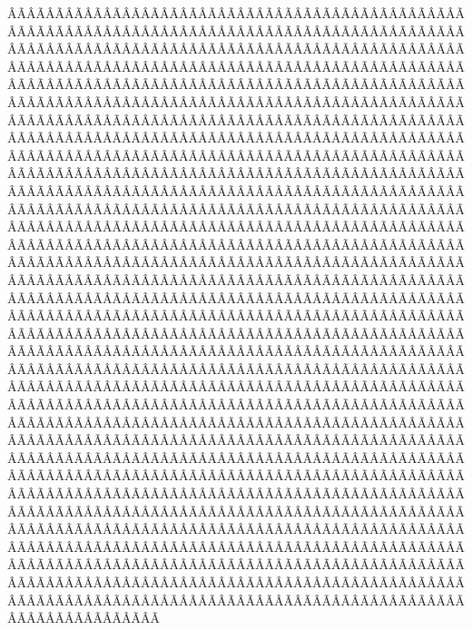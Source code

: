 \begin{sumilla}
\begin{fundamentacion}
ÂÃÂÃÂÃÂÃÂÃÂÃÂÃÂÃÂÃÂÃÂÃÂÃÂÃÂÃÂÃÂÃÂÃÂÃÂÃÂÃÂÃÂÃÂÃÂÃÂÃÂÃÂÃÂÃÂÃÂÃÂÃÂÃÂÃÂÃÂÃÂÃÂÃÂÃÂÃÂÃÂÃÂÃÂÃÂÃÂÃÂÃÂÃÂÃÂÃÂÃÂÃÂÃÂÃÂÃÂÃÂÃÂÃÂÃÂÃÂÃÂÃÂÃÂÃÂÃÂÃÂÃÂÃÂÃÂÃÂÃÂÃÂÃÂÃÂÃÂÃÂÃÂÃÂÃÂÃÂÃÂÃÂÃÂÃÂÃÂÃÂÃÂÃÂÃÂÃÂÃÂÃÂÃÂÃÂÃÂÃÂÃÂÃÂÃÂÃÂÃÂÃÂÃÂÃÂÃÂÃÂÃÂÃÂÃÂÃÂÃÂÃÂÃÂÃÂÃÂÃÂÃÂÃÂÃÂÃÂÃÂÃÂÃÂÃÂÃÂÃÂÃÂÃÂÃÂÃÂÃÂÃÂÃÂÃÂÃÂÃÂÃÂÃÂÃÂÃÂÃÂÃÂÃÂÃÂÃÂÃÂÃÂÃÂÃÂÃÂÃÂÃÂÃÂÃÂÃÂÃÂÃÂÃÂÃÂÃÂÃÂÃÂÃÂÃÂÃÂÃÂÃÂÃÂÃÂÃÂÃÂÃÂÃÂÃÂÃÂÃÂÃÂÃÂÃÂÃÂÃÂÃÂÃÂÃÂÃÂÃÂÃÂÃÂÃÂÃÂÃÂÃÂÃÂÃÂÃÂÃÂÃÂÃÂÃÂÃÂÃÂÃÂÃÂÃÂÃÂÃÂÃÂÃÂÃÂÃÂÃÂÃÂÃÂÃÂÃÂÃÂÃÂÃÂÃÂÃÂÃÂÃÂÃÂÃÂÃÂÃÂÃÂÃÂÃÂÃÂÃÂÃÂÃÂÃÂÃÂÃÂÃÂÃÂÃÂÃÂÃÂÃÂÃÂÃÂÃÂÃÂÃÂÃÂÃÂÃÂÃÂÃÂÃÂÃÂÃÂÃÂÃÂÃÂÃÂÃÂÃÂÃÂÃÂÃÂÃÂÃÂÃÂÃÂÃÂÃÂÃÂÃÂÃÂÃÂÃÂÃÂÃÂÃÂÃÂÃÂÃÂÃÂÃÂÃÂÃÂÃÂÃÂÃÂÃÂÃÂÃÂÃÂÃÂÃÂÃÂÃÂÃÂÃÂÃÂÃÂÃÂÃÂÃÂÃÂÃÂÃÂÃÂÃÂÃÂÃÂÃÂÃÂÃÂÃÂÃÂÃÂÃÂÃÂÃÂÃÂÃÂÃÂÃÂÃÂÃÂÃÂÃÂÃÂÃÂÃÂÃÂÃÂÃÂÃÂÃÂÃÂÃÂÃÂÃÂÃÂÃÂÃÂÃÂÃÂÃÂÃÂÃÂÃÂÃÂÃÂÃÂÃÂÃÂÃÂÃÂÃÂÃÂÃÂÃÂÃÂÃÂÃÂÃÂÃÂÃÂÃÂÃÂÃÂÃÂÃÂÃÂÃÂÃÂÃÂÃÂÃÂÃÂÃÂÃÂÃÂÃÂÃÂÃÂÃÂÃÂÃÂÃÂÃÂÃÂÃÂÃÂÃÂÃÂÃÂÃÂÃÂÃÂÃÂÃÂÃÂÃÂÃÂÃÂÃÂÃÂÃÂÃÂÃÂÃÂÃÂÃÂÃÂÃÂÃÂÃÂÃÂÃÂÃÂÃÂÃÂÃÂÃÂÃÂÃÂÃÂÃÂÃÂÃÂÃÂÃÂÃÂÃÂÃÂÃÂÃÂÃÂÃÂÃÂÃÂÃÂÃÂÃÂÃÂÃÂÃÂÃÂÃÂÃÂÃÂÃÂÃÂÃÂÃÂÃÂÃÂÃÂÃÂÃÂÃÂÃÂÃÂÃÂÃÂÃÂÃÂÃÂÃÂÃÂÃÂÃÂÃÂÃÂÃÂÃÂÃÂÃÂÃÂÃÂÃÂÃÂÃÂÃÂÃÂÃÂÃÂÃÂÃÂÃÂÃÂÃÂÃÂÃÂÃÂÃÂÃÂÃÂÃÂÃÂÃÂÃÂÃÂÃÂÃÂÃÂÃÂÃÂÃÂÃÂÃÂÃÂÃÂÃÂÃÂÃÂÃÂÃÂÃÂÃÂÃÂÃÂÃÂÃÂÃÂÃÂÃÂÃÂÃÂÃÂÃÂÃÂÃÂÃÂÃÂÃÂÃÂÃÂÃÂÃÂÃÂÃÂÃÂÃÂÃÂÃÂÃÂÃÂÃÂÃÂÃÂÃÂÃÂÃÂÃÂÃÂÃÂÃÂÃÂÃÂÃÂÃÂÃÂÃÂÃÂÃÂÃÂÃÂÃÂÃÂÃÂÃÂÃÂÃÂÃÂÃÂÃÂÃÂÃÂÃÂÃÂÃÂÃÂÃÂÃÂÃÂÃÂÃÂÃÂÃÂÃÂÃÂÃÂÃÂÃÂÃÂÃÂÃÂÃÂÃÂÃÂÃÂÃÂÃÂÃÂÃÂÃÂÃÂÃÂÃÂÃÂÃÂÃÂÃÂÃÂÃÂÃÂÃÂÃÂÃÂÃÂÃÂÃÂÃÂÃÂÃÂÃÂÃÂÃÂÃÂÃÂÃÂÃÂÃÂÃÂÃÂÃÂÃÂÃÂÃÂÃÂÃÂÃÂÃÂÃÂÃÂÃÂÃÂÃÂÃÂÃÂÃÂÃÂÃÂÃÂÃÂÃÂÃÂÃÂÃÂÃÂÃÂÃÂÃÂÃÂÃÂÃÂÃÂÃÂÃÂÃÂÃÂÃÂÃÂÃÂÃÂÃÂÃÂÃÂÃÂÃÂÃÂÃÂÃÂÃÂÃÂÃÂÃÂÃÂÃÂÃÂÃÂÃÂÃÂÃÂÃÂÃÂÃÂÃÂÃÂÃÂÃÂÃÂÃÂÃÂÃÂÃÂÃÂÃÂÃÂÃÂÃÂÃÂÃÂÃÂÃÂÃÂÃÂÃÂÃÂÃÂÃÂÃÂÃÂÃÂÃÂÃÂÃÂÃÂÃÂÃÂÃÂÃÂÃÂÃÂÃÂÃÂÃÂÃÂÃÂÃÂÃÂÃÂÃÂÃÂÃÂÃÂÃÂÃÂÃÂÃÂÃÂÃÂÃÂÃÂÃÂÃÂÃÂÃÂÃÂÃÂÃÂÃÂÃÂÃÂÃÂÃÂÃÂÃÂÃÂÃÂÃÂÃÂÃÂÃÂÃÂÃÂÃÂÃÂÃÂÃÂÃÂÃÂÃÂÃÂÃÂÃÂÃÂÃÂÃÂÃÂÃÂÃÂÃÂÃÂÃÂÃÂÃÂÃÂÃÂÃÂÃÂÃÂÃÂÃÂÃÂÃÂÃÂÃÂÃÂÃÂÃÂÃÂÃÂÃÂÃÂÃÂÃÂÃÂÃÂÃÂÃÂÃÂÃÂÃÂÃÂÃ
\end{fundamentacion}
\end{sumilla}
